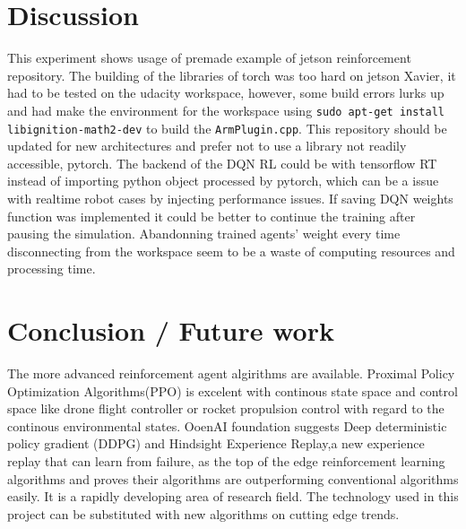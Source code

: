 \documentclass[10pt,journal,compsoc]{IEEEtran}
\begin{document}
\section{Discussion}
 This experiment shows usage of premade example of jetson reinforcement repository. The building of the libraries of torch was too hard on jetson Xavier, it had to be tested on the udacity workspace, however, some build errors lurks up and had make the environment for the workspace using \verb!sudo apt-get install libignition-math2-dev! to build the \verb!ArmPlugin.cpp!. This repository should be updated for new architectures and prefer not to use a library not readily accessible, pytorch. The backend of the DQN RL could be with tensorflow RT instead of importing python object processed by pytorch, which can be a issue with realtime robot cases by injecting performance issues.
 If saving DQN weights function was implemented it could be better to continue the training after pausing the simulation. Abandonning trained agents' weight every time disconnecting from the workspace seem to be a waste of computing resources and processing time.

 \section{Conclusion / Future work}
The more advanced reinforcement agent algirithms are available. Proximal Policy Optimization Algorithms(PPO) \cite{Schulman2017} is excelent with continous state space and control space like drone flight controller or rocket propulsion control with regard to the continous environmental states. OoenAI foundation suggests Deep deterministic policy gradient (DDPG)\cite{Lillicrap2015} and  Hindsight Experience Replay\cite{Andrychowicz2017},a new experience replay that can learn from failure, as the top of the edge reinforcement learning algorithms and proves their algorithms are outperforming conventional algorithms easily. It is a rapidly developing area of research field. The technology used in this project can be substituted with new algorithms on cutting edge trends.


\end{document}
